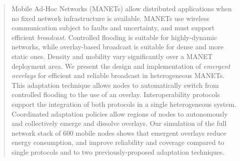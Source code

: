
\begin{abstract}
Mobile Ad-Hoc Networks (MANETs) allow distributed applications when no fixed network infrastructure is available.
MANETs use wireless communication subject to faults and uncertainty, and must support efficient \emph{broadcast}.
Controlled flooding is suitable for highly-dynamic networks, while overlay-based broadcast is suitable for dense and more static ones.
Density and mobility vary significantly over a MANET deployment area.
We present the design and implementation of \emph{emergent overlays} for efficient and reliable broadcast in heterogeneous MANETs.
This adaptation technique allows nodes to automatically switch from controlled flooding to the use of an overlay.
Interoperability protocols support the integration of both protocols in a single heterogeneous system.
Coordinated adaptation policies allow regions of nodes to autonomously and collectively emerge and dissolve overlays.
Our simulation of the full network stack of 600 mobile nodes shows that emergent overlays reduce energy consumption, and improve reliability and coverage compared to single protocols and to two previously-proposed adaptation techniques.
\end{abstract}
